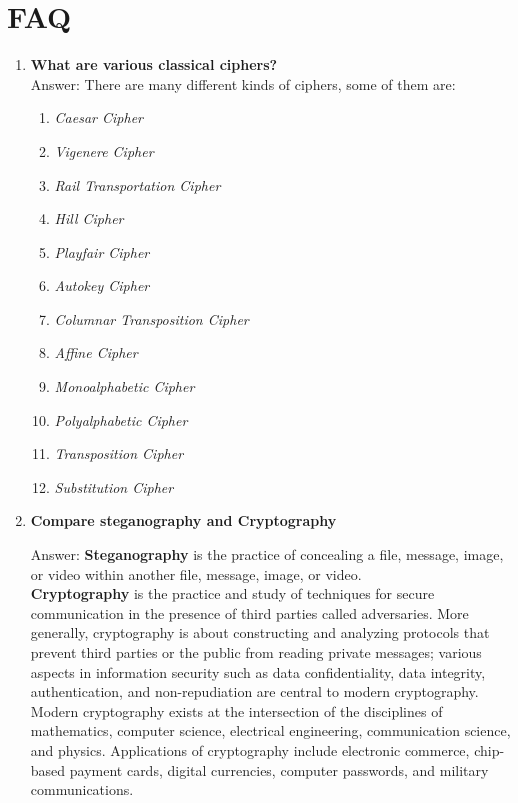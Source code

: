 \documentclass[openany]{book}
\begin{document}
\section{FAQ}

\begin{enumerate}
	\item \textbf{What are various classical ciphers?}\\
	      Answer:
	      There are many different kinds of ciphers, some of them are:
	      \begin{enumerate}
		      \item \textit{Caesar Cipher}
		      \item  \textit{Vigenere Cipher}
		      \item  \textit{Rail Transportation Cipher}
		      \item  \textit{Hill Cipher}
		      \item  \textit{Playfair Cipher}
		      \item  \textit{Autokey Cipher}
		      \item  \textit{Columnar Transposition Cipher}
		      \item  \textit{Affine Cipher}
		      \item  \textit{Monoalphabetic Cipher}
		      \item  \textit{Polyalphabetic Cipher}
		      \item  \textit{Transposition Cipher}
		      \item  \textit{Substitution Cipher}
	      \end{enumerate}

	\item \textbf{Compare steganography and Cryptography}

	      Answer: \textbf{Steganography} is the practice of concealing a file, message, image, or video within another file, message, image, or video.\\

	      \textbf{Cryptography} is the practice and study of techniques for secure communication in the presence of third parties called adversaries. More generally, cryptography is about constructing and analyzing protocols that prevent third parties or the public from reading private messages; various aspects in information security such as data confidentiality, data integrity, authentication, and non-repudiation are central to modern cryptography. Modern cryptography exists at the intersection of the disciplines of mathematics, computer science, electrical engineering, communication science, and physics. Applications of cryptography include electronic commerce, chip-based payment cards, digital currencies, computer passwords, and military communications.\\


\end{enumerate}
\end{document}
